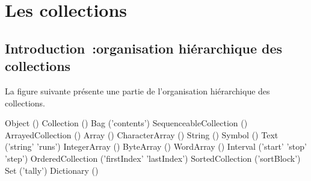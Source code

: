 
\ifx\wholebook\relax\else


\fi

\chapter{Les collections}



%

%

\section{Introduction~:organisation  hi\'erarchique des collections}
La figure suivante pr\'esente une partie de l'organisation hi\'erarchique des collections.



\begin{scode}
Object ()
    Collection ()
          Bag ('contents')
          SequenceableCollection ()
                ArrayedCollection ()
                    Array ()
                    CharacterArray ()
                          String ()
                            Symbol ()
                          Text ('string' 'runs')
                    IntegerArray ()
                         ByteArray ()
                         WordArray ()
               Interval ('start' 'stop' 'step')
               OrderedCollection ('firstIndex' 'lastIndex')
                   SortedCollection ('sortBlock')
          Set ('tally')
               Dictionary ()
\end{scode}

